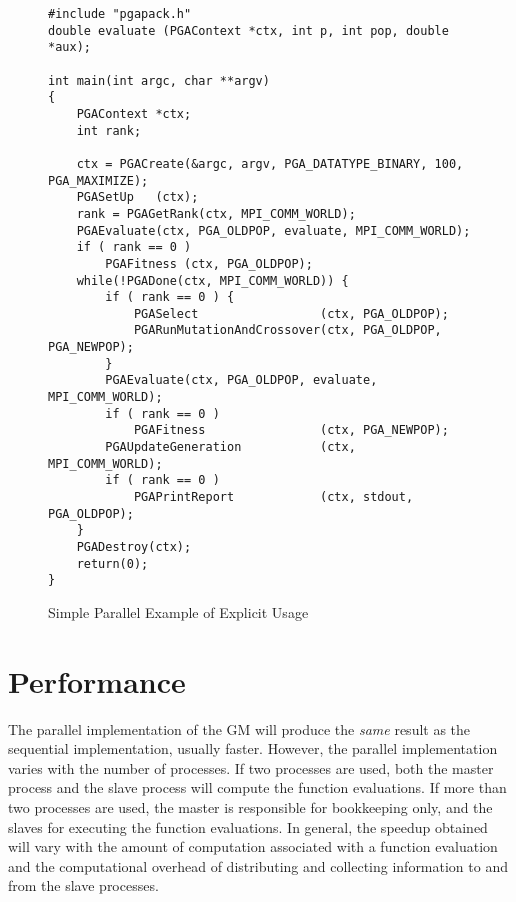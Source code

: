 \documentclass{report}
\begin{document}
\begin{figure}
\begin{verbatim}
#include "pgapack.h"
double evaluate (PGAContext *ctx, int p, int pop, double *aux);

int main(int argc, char **argv)
{
    PGAContext *ctx;
    int rank;

    ctx = PGACreate(&argc, argv, PGA_DATATYPE_BINARY, 100, PGA_MAXIMIZE);
    PGASetUp   (ctx);
    rank = PGAGetRank(ctx, MPI_COMM_WORLD);
    PGAEvaluate(ctx, PGA_OLDPOP, evaluate, MPI_COMM_WORLD);
    if ( rank == 0 )
        PGAFitness (ctx, PGA_OLDPOP);
    while(!PGADone(ctx, MPI_COMM_WORLD)) {
        if ( rank == 0 ) {
            PGASelect                 (ctx, PGA_OLDPOP);
            PGARunMutationAndCrossover(ctx, PGA_OLDPOP, PGA_NEWPOP);
        }
        PGAEvaluate(ctx, PGA_OLDPOP, evaluate, MPI_COMM_WORLD);
        if ( rank == 0 )
            PGAFitness                (ctx, PGA_NEWPOP);
        PGAUpdateGeneration           (ctx, MPI_COMM_WORLD);
        if ( rank == 0 )
            PGAPrintReport            (ctx, stdout, PGA_OLDPOP);
    }
    PGADestroy(ctx);
    return(0);
}
\end{verbatim}
\caption{Simple Parallel Example of Explicit Usage}
\label{simple-parexample}
\end{figure}



\section{Performance}\label{sec:par-performance}

The parallel implementation of the GM will produce the {\em same} result as
the sequential implementation, usually faster.  However, the parallel
implementation varies with the number of processes.  If two processes are
used, both the master process and the slave process will compute the function
evaluations.  If more than two processes are used, the master is responsible
for bookkeeping only, and the slaves for executing the function evaluations.
In general, the speedup obtained will vary with the amount of computation
associated with a function evaluation and the computational overhead of
distributing and collecting information to and from the slave processes.
\end{document}

